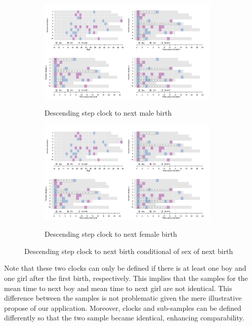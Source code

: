\documentclass[a4paper,left=1.25cm,right=1.25cm,top=1.25cm,bottom=1.25cm]{article}
\begin{document}
\begin{figure}[H]
   \begin{subfigure}{\textwidth}
      \centering
   \includegraphics[trim=0cm 0cm 17.6cm 10cm, clip, width=0.95\textwidth]{Figures/colombia/illu_fertility.pdf}\\
    \caption{Descending step clock to next male birth}
    \label{fert_clockb}
    \end{subfigure}
    
       \begin{subfigure}{\textwidth}
      \centering
    \includegraphics[trim=17.4cm 0cm 0cm 10cm, clip, width=0.95\textwidth]{Figures/colombia/illu_fertility.pdf}\\
    \caption{Descending step clock to next female birth}
    \label{fert_clockg}
    \end{subfigure}
    \label{fert_clock}
    \caption{Descending step clock to next birth conditional of sex of next birth}
\end{figure}

Note that these two clocks can only be defined if there is at least one boy and one girl after the first birth, respectively. This implies that the samples for the mean time to next boy and mean time to next girl are not identical. This difference between the samples is not problematic given the mere illustrative propose of our application. Moreover, clocks and sub-samples can be defined differently so that the two sample became identical, enhancing comparability.
\end{document}
